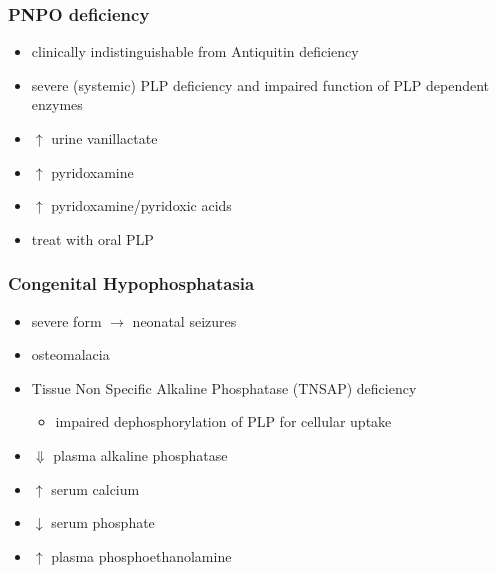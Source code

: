 \documentclass{scrartcl}
\begin{document}
\subsubsection{PNPO deficiency}
\label{sec:org3354390}
\begin{itemize}
\item clinically indistinguishable from Antiquitin deficiency
\item severe (systemic) PLP deficiency and impaired function of PLP
dependent enzymes
\item \(\uparrow\) urine vanillactate
\item \(\uparrow\) pyridoxamine
\item \(\uparrow\) pyridoxamine/pyridoxic acids
\item treat with oral PLP
\end{itemize}

\subsubsection{Congenital Hypophosphatasia}
\label{sec:orge31c46c}
\begin{itemize}
\item severe form \(\to\) neonatal seizures
\item osteomalacia
\item Tissue Non Specific Alkaline Phosphatase (TNSAP) deficiency
\begin{itemize}
\item impaired dephosphorylation of PLP for cellular uptake
\end{itemize}
\item \(\Downarrow\) plasma alkaline phosphatase
\item \(\uparrow\) serum calcium
\item \(\downarrow\) serum phosphate
\item \(\uparrow\) plasma phosphoethanolamine
\end{itemize}
\end{document}
